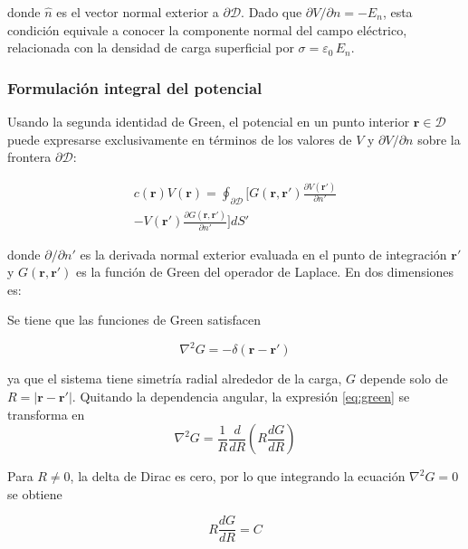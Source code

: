 \documentclass[12pt, twocolumn]{article}
\begin{document}
donde $\hat{n}$ es el vector normal exterior a $\partial\mathcal{D}$. Dado que $\partial V/\partial n = -E_n$, esta condición equivale a conocer la componente normal del campo eléctrico, relacionada con la densidad de carga superficial por $\sigma = \varepsilon_0\,E_n$.

\subsubsection{Formulación integral del potencial}

Usando la segunda identidad de Green, el potencial en un punto interior $\mathbf{r} \in \mathcal{D}$ puede expresarse exclusivamente en términos de los valores de $V$ y $\partial V/\partial n$ sobre la frontera $\partial\mathcal{D}$:

\begin{equation} \label{eq:repr_integral}
    \begin{gathered}
        c(\mathbf{r}) V(\mathbf{r}) = \oint_{\partial \mathcal{D}} \bigg[
        G(\mathbf{r}, \mathbf{r}') \frac{\partial V(\mathbf{r}')}{\partial n'} \\
        - V(\mathbf{r}') \frac{\partial G(\mathbf{r}, \mathbf{r}')}{\partial n'}
        \bigg] dS'
    \end{gathered}
\end{equation}

donde $\partial/\partial n'$ es la derivada normal exterior evaluada en el punto de integración $\mathbf{r}'$ y $G(\mathbf{r}, \mathbf{r}')$ es la función de Green del operador de Laplace. En dos dimensiones es:

Se tiene que las funciones de Green satisfacen 

\begin{equation} \label{eq:green}
    \nabla^2 G = -\delta(\mathbf{r} - \mathbf{r}')
\end{equation}

ya que el sistema tiene simetría radial alrededor de la carga, $G$ depende solo de $R = |\mathbf{r} - \mathbf{r}'|$. Quitando la dependencia angular, la expresión \ref{eq:green} se transforma en  
\begin{equation}
    \nabla^2 G = \frac{1}{R} \frac{d}{dR} \left( R \frac{dG}{dR} \right)
\end{equation}

Para $R \neq 0$, la delta de Dirac es cero, por lo que integrando la ecuación $\nabla^2 G = 0$ se obtiene

\begin{equation}
    R \frac{dG}{dR} = C
\end{equation}
\end{document}
